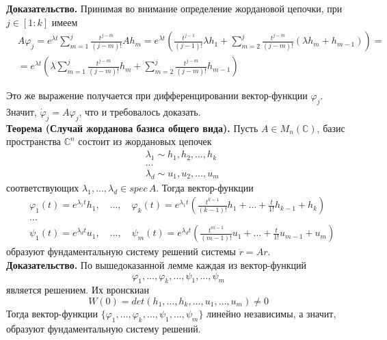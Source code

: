 \documentclass{article}
\begin{document}
\noindent \textbf{Доказательство.} Принимая во внимание определение жордановой цепочки, при $j \in [1 : k]$ имеем
\begin{equation*}
    \begin{aligned}
        &A\varphi_j = e^{\lambda t}\sum_{m=1}^j \frac{t^{j-m}}{(j-m)!}Ah_m = e^{\lambda t} \left(\frac{t^{j-1}}{(j-1)!}\lambda h_1 + \sum_{m=2}^j \frac{t^{j-m}}{(j-m)!}(\lambda h_m + h_{m - 1}) \right) = \\
        &= e^{\lambda t}\left(\lambda \sum_{m=1}^j \frac{t^{j - m}}{(j - m)!}h_m + \sum_{m = 2}^j \frac{t^{j-m}}{(j - m)!}h_{m-1} \right)
    \end{aligned}
\end{equation*}

Это же выражение получается при дифференцировании вектор-функции $\varphi_j$. Значит, $\dot{\varphi}_j = A\varphi_j$, что и требовалось доказать.\\

\noindent \textbf{Теорема (Случай жорданова базиса общего вида).} Пусть $A \in M_n(\mathbb{C})$, базис пространства $\mathbb{C}^n$ состоит из жордановых цепочек
\begin{equation*}
    \begin{aligned}
        &\lambda_1 \sim h_1, h_2, \ldots, h_k\\
        &\ldots\\
        &\lambda_d \sim u_1, u_2, \ldots, u_m
    \end{aligned}
\end{equation*}
соответствующих $\lambda_1, \ldots, \lambda_d \in spec\, A$. Тогда вектор-функции
\begin{equation*}
    \begin{aligned}
        &\varphi_1(t) = e^{\lambda_1 t}h_1, \quad \ldots, \quad \varphi_k(t) = e^{\lambda_1 t}\left(\frac{t^{k-1}}{(k-1)!}h_1 + \ldots + \frac{t}{1!}h_{k-1} + h_k \right)\\
        &\ldots\\
        &\psi_1(t) = e^{\lambda_d t}u_1, \quad \ldots, \quad \psi_m(t) = e^{\lambda_d t}\left(\frac{t^{m-1}}{(m-1)!}u_1 + \ldots + \frac{t}{1!}u_{m-1} + u_m \right)
    \end{aligned}
\end{equation*}
образуют фундаментальную систему решений системы $\dot{r} = Ar$.\\

\noindent \textbf{Доказательство.} По вышедоказанной лемме каждая из вектор-функций
\begin{equation*}
    \varphi_1, \ldots, \varphi_k, \ldots, \psi_1, \ldots, \psi_m
\end{equation*}
является решением. Их вронскиан
\begin{equation*}
    W(0) = det(h_1, \ldots, h_k, \ldots, u_1, \ldots, u_m) \neq 0
\end{equation*}
Тогда вектор-функции $\{\varphi_1, \ldots, \varphi_k, \ldots, \psi_1, \ldots, \psi_m\}$ линейно независимы, а значит, образуют фундаментальную систему решений.\\
\end{document}
